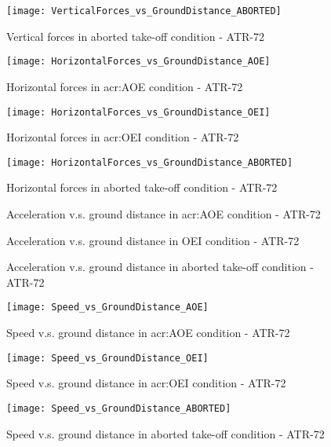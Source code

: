 %
\begin{figure}[H]
\centering
\texttt{[image: VerticalForces\_vs\_GroundDistance\_ABORTED]}
\caption{Vertical forces in aborted take-off condition - ATR-72}
\end{figure}
%
\begin{figure}[H]
\centering
\texttt{[image: HorizontalForces\_vs\_GroundDistance\_AOE]}
\caption{Horizontal forces in \gls{acr:AOE} condition - ATR-72}
\end{figure}
%
\begin{figure}[H]
\centering
\texttt{[image: HorizontalForces\_vs\_GroundDistance\_OEI]}
\caption{Horizontal forces in \gls{acr:OEI} condition - ATR-72}
\end{figure}
%
\begin{figure}[H]
\centering
\texttt{[image: HorizontalForces\_vs\_GroundDistance\_ABORTED]}
\caption{Horizontal forces in aborted take-off condition - ATR-72}
\end{figure}
%
\begin{figure}[H]
\centering

\caption{Acceleration v.s. ground distance in \gls{acr:AOE} condition - ATR-72}
\end{figure}
%
\begin{figure}[H]
\centering

\caption{Acceleration v.s. ground distance in OEI condition - ATR-72}
\end{figure}
%
\begin{figure}[H]
\centering

\caption{Acceleration v.s. ground distance in aborted take-off condition - ATR-72}
\end{figure}
%
\begin{figure}[H]
\centering
\texttt{[image: Speed\_vs\_GroundDistance\_AOE]}
\caption{Speed v.s. ground distance in \gls{acr:AOE} condition - ATR-72}
\end{figure}
%
\begin{figure}[H]
\centering
\texttt{[image: Speed\_vs\_GroundDistance\_OEI]}
\caption{Speed v.s. ground distance in \gls{acr:OEI} condition - ATR-72}
\end{figure}
%
\begin{figure}[H]
\centering
\texttt{[image: Speed\_vs\_GroundDistance\_ABORTED]}
\caption{Speed v.s. ground distance in aborted take-off condition - ATR-72}
\end{figure}
